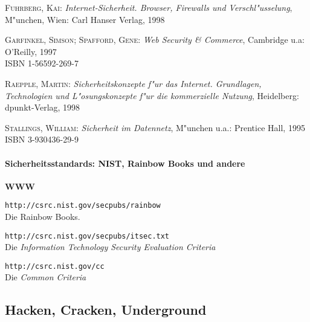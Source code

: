 \begin{description}
  
\item \textsc{Fuhrberg, Kai}: \textit{Internet-Sicherheit. Browser,
    Firewalls und Verschl"usselung}, M"unchen, Wien: Carl Hanser
  Verlag, 1998
  
\item \textsc{Garfinkel, Simson; Spafford, Gene}: \textit{Web Security
    \& Commerce},
  Cambridge u.a: O'Reilly, 1997 \\
  ISBN 1-56592-269-7
  
\item \textsc{Raepple, Martin}: \textit{Sicherheitskonzepte f"ur das
    Internet. Grundlagen, Technologien und L"osungskonzepte f"ur die
    kommerzielle Nutzung}, Heidelberg: dpunkt-Verlag, 1998
  
\item \textsc{Stallings, William}: \textit{Sicherheit im Datennetz},
  M"unchen u.a.: Prentice Hall, 1995 \\
  ISBN 3-930436-29-9

\end{description}


\paragraph{Sicherheitsstandards: NIST, Rainbow Books und andere}

\textbf{WWW}

\begin{description}
  

\item \texttt{http://csrc.nist.gov/secpubs/rainbow} \\
  Die Rainbow Books.
  

\item \texttt{http://csrc.nist.gov/secpubs/itsec.txt} \\
  Die \textit{Information Technology Security Evaluation Criteria}
  

\item \texttt{http://csrc.nist.gov/cc} \\
  Die \textit{Common Criteria}

\end{description}


\subsection{Hacken, Cracken, Underground}

